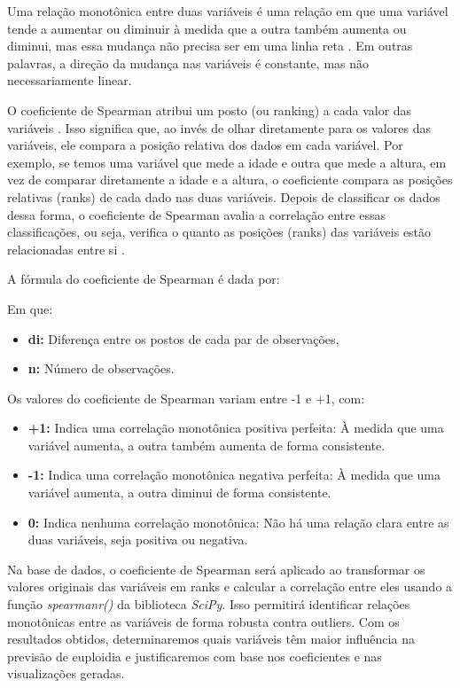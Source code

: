 \begin{apendicesenv}
Uma relação monotônica entre duas variáveis é uma relação em que uma variável tende a aumentar ou diminuir à medida que a outra também aumenta ou diminui, mas essa mudança não precisa ser em uma linha reta \cite{restrepo2007}. Em outras palavras, a direção da mudança nas variáveis é constante, mas não necessariamente linear.

O coeficiente de Spearman atribui um posto (ou ranking) a cada valor das variáveis \cite{sousa2019}. Isso significa que, ao invés de olhar diretamente para os valores das variáveis, ele compara a posição relativa dos dados em cada variável. Por exemplo, se temos uma variável que mede a idade e outra que mede a altura, em vez de comparar diretamente a idade e a altura, o coeficiente compara as posições relativas (ranks) de cada dado nas duas variáveis. Depois de classificar os dados dessa forma, o coeficiente de Spearman avalia a correlação entre essas classificações, ou seja, verifica o quanto as posições (ranks) das variáveis estão relacionadas entre si \cite{sousa2019}.

A fórmula do coeficiente de Spearman é dada por:



Em que:
\begin{itemize}
  \item \textbf{di:} Diferença entre os postos de cada par de observações,
  \item \textbf{n:} Número de observações.
\end{itemize}

Os valores do coeficiente de Spearman variam entre -1 e +1, com:
\begin{itemize}
  \item \textbf{+1:} Indica uma correlação monotônica positiva perfeita: À medida que uma variável aumenta, a outra também aumenta de forma consistente.
  \item \textbf{-1:} Indica uma correlação monotônica negativa perfeita: À medida que uma variável aumenta, a outra diminui de forma consistente.
  \item \textbf{0:} Indica nenhuma correlação monotônica: Não há uma relação clara entre as duas variáveis, seja positiva ou negativa.
\end{itemize}

Na base de dados, o coeficiente de Spearman será aplicado ao transformar os valores originais das variáveis em ranks e calcular a correlação entre eles usando a função \textit{spearmanr()} da biblioteca \textit{SciPy}. Isso permitirá identificar relações monotônicas entre as variáveis de forma robusta contra outliers. Com os resultados obtidos, determinaremos quais variáveis têm maior influência na previsão de euploidia e justificaremos com base nos coeficientes e nas visualizações geradas.

\end{apendicesenv}
